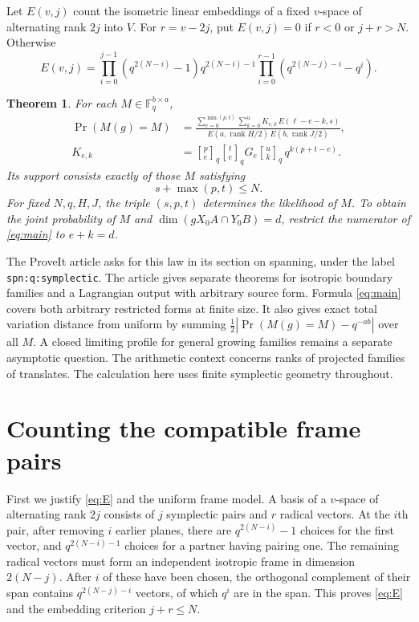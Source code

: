 \documentclass[10pt]{article}
\newtheorem{theorem}{Theorem}
\DeclareMathOperator{\rk}{rank}
\newcommand{\F}{\mathbb F_q}
\newcommand{\gb}[2]{\genfrac{[}{]}{0pt}{}{#1}{#2}_{q}}
\begin{document}
Let $E(v,j)$ count the isometric linear embeddings of a fixed $v$-space of alternating rank $2j$ into $V$. For $r=v-2j$, put $E(v,j)=0$ if $r<0$ or $j+r>N$. Otherwise
\begin{equation}\label{eq:E}
 E(v,j)=
 \prod_{i=0}^{j-1}(q^{2(N-i)}-1)q^{2(N-i)-1}
 \prod_{i=0}^{r-1}(q^{2(N-j)-i}-q^i).
\end{equation}

\begin{theorem}\label{thm:main}
For each $M\in\F^{b\times a}$,
\begin{align}
 \Pr(M(g)=M)
 &=\frac{\displaystyle\sum_{e=0}^{\min(p,t)}\sum_{k=0}^{u}
     K_{e,k}\,E(\ell-e-k,s)}
        {E(a,\rk H/2)\,E(b,\rk J/2)},\label{eq:main}\\
 K_{e,k}
 &=\gb{p}{e}\gb{t}{e}G_e\gb{u}{k}\,q^{k(p+t-e)}.\label{eq:K}
\end{align}
Its support consists exactly of those $M$ satisfying
\begin{equation}\label{eq:support}
                s+\max(p,t)\le N.
\end{equation}
For fixed $N,q,H,J$, the triple $(s,p,t)$ determines the likelihood of $M$. To obtain the joint probability of $M$ and
$\dim(gX_0A\cap Y_0B)=d$, restrict the numerator of \eqref{eq:main} to $e+k=d$.
\end{theorem}

The ProveIt article \cite{article} asks for this law in its section on spanning, under the label \texttt{spn:q:symplectic}. The article gives separate theorems for isotropic boundary families and a Lagrangian output with arbitrary source form. Formula \eqref{eq:main} covers both arbitrary restricted forms at finite size. It also gives exact total variation distance from uniform by summing $\tfrac12|\Pr(M(g)=M)-q^{-ab}|$ over all $M$. A closed limiting profile for general growing families remains a separate asymptotic question. The arithmetic context concerns ranks of projected families of translates. The calculation here uses finite symplectic geometry throughout.

\section{Counting the compatible frame pairs}

First we justify \eqref{eq:E} and the uniform frame model. A basis of a $v$-space of alternating rank $2j$ consists of $j$ symplectic pairs and $r$ radical vectors. At the $i$th pair, after removing $i$ earlier planes, there are $q^{2(N-i)}-1$ choices for the first vector, and $q^{2(N-i)-1}$ choices for a partner having pairing one. The remaining radical vectors must form an independent isotropic frame in dimension $2(N-j)$. After $i$ of these have been chosen, the orthogonal complement of their span contains $q^{2(N-j)-i}$ vectors, of which $q^i$ are in the span. This proves \eqref{eq:E} and the embedding criterion $j+r\le N$.
\end{document}
